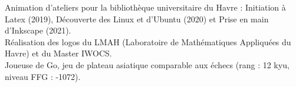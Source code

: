 \documentclass[]{cv-style}          %
\begin{document}
\vspace{-0.2cm}

Animation d'ateliers pour la bibliothèque universitaire du Havre : Initiation à Latex (2019), Découverte des Linux et d'Ubuntu (2020) et Prise en main d'Inkscape (2021).\\
Réalisation des logos du LMAH (Laboratoire de Mathématiques Appliquées du Havre) et du Master IWOCS.\\
Joueuse de Go, jeu de plateau asiatique comparable aux échecs (rang : 12 kyu, niveau FFG : -1072).

\end{document}
